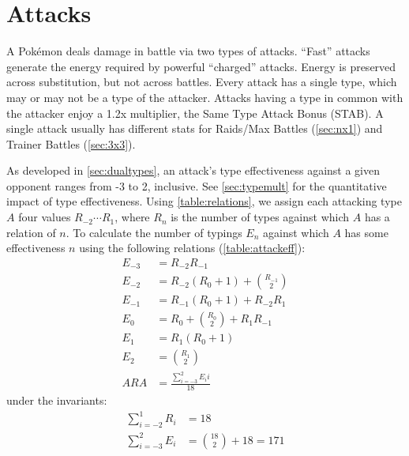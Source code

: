 \chapter{Attacks}
\label{chap:attacks}
A Pokémon deals damage in battle via two types of attacks.
``Fast'' attacks generate the energy required by powerful ``charged'' attacks.
Energy is preserved across substitution, but not across battles.
Every attack has a single type, which may or may not be a type of the attacker.
Attacks having a type in common with the attacker enjoy a 1.2x multiplier, the Same Type Attack Bonus (STAB).
A single attack usually has different stats for Raids/Max Battles (\autoref{sec:nx1})
  and Trainer Battles (\autoref{sec:3x3}).

As developed in \autoref{sec:dualtypes}, an attack's type effectiveness
  against a given opponent ranges from -3 to 2, inclusive.
See \autoref{sec:typemult} for the quantitative impact of type effectiveness.
Using \autoref{table:relations}, we assign each attacking type $A$ four values
  $R_{-2}\cdots{}R_1$, where $R_n$ is the number of types against which $A$ has a
  relation of $n$.
To calculate the number of typings $E_n$ against which $A$ has some effectiveness $n$
  using the following relations (\autoref{table:attackeff}):
\begin{align*}
  E_{-3} &= R_{-2}R_{-1}\\
  E_{-2} &= R_{-2}(R_0 + 1) + \binom{R_{-1}}{2}\\
  E_{-1} &= R_{-1}(R_0 + 1) + R_{-2}R_1\\
   E_{0} &= R_0 + \binom{R_0}{2} + R_{1}R_{-1}\\
   E_{1} &= R_{1}(R_0 + 1)\\
   E_{2} &= \binom{R_1}{2}\\
   ARA &= \frac{\sum_{i=-3}^{2} E_{i}i}{18}
\end{align*}
under the invariants:
\begin{align*}
    \sum_{i=-2}^{1} R_i &= 18\\
   \sum_{i=-3}^{2} E_i &= \binom{18}{2} + 18  = 171
\end{align*}
